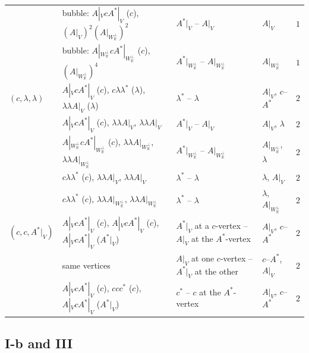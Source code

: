 \begin{tabular}{l|l|l|l|c}
 & bubble: $A|_VcA^*|_V$ ($c$), $(A|_V)^2(A|_{W_{\mathbb R}^\perp})^2$ & $A^*|_V$ -- $A|_V$ & $A|_V$ & $1$ \\
 & bubble: $A|_{W_{\mathbb R}^\perp}cA^*|_{W_{\mathbb R}^\perp}$ ($c$), $(A|_{W_{\mathbb R}^\perp})^4$ & $A^*|_{W_{\mathbb R}^\perp}$ -- $A|_{W_{\mathbb R}^\perp}$ & $A|_{W_{\mathbb R}^\perp}$ & $1$ \\
\hline
$(c,\lambda,\lambda)$ & $A|_VcA^*|_V$ ($c$), $c\lambda\lambda^*$ ($\lambda$), $\lambda\lambda A|_V$ ($\lambda$) & $\lambda^*$ -- $\lambda$ & $A|_V$, $c$--$A^*$ & $2$ \\
 & $A|_VcA^*|_V$ ($c$), $\lambda\lambda A|_V$, $\lambda\lambda A|_V$ & $A^*|_V$ -- $A|_V$ & $A|_V$, $\lambda$ & $2$ \\
 & $A|_{W_{\mathbb R}^\perp}cA^*|_{W_{\mathbb R}^\perp}$ ($c$), $\lambda\lambda A|_{W_{\mathbb R}^\perp}$, $\lambda\lambda A|_{W_{\mathbb R}^\perp}$ & $A^*|_{W_{\mathbb R}^\perp}$ -- $A|_{W_{\mathbb R}^\perp}$ & $A|_{W_{\mathbb R}^\perp}$, $\lambda$ & $2$ \\
 & $c\lambda\lambda^*$ ($c$), $\lambda\lambda A|_V$, $\lambda\lambda A|_V$ & $\lambda^*$ -- $\lambda$ & $\lambda$, $A|_V$ & $2$ \\
 & $c\lambda\lambda^*$ ($c$), $\lambda\lambda A|_{W_{\mathbb R}^\perp}$, $\lambda\lambda A|_{W_{\mathbb R}^\perp}$ & $\lambda^*$ -- $\lambda$ & $\lambda$, $A|_{W_{\mathbb R}^\perp}$ & $2$ \\
\hline
$(c,c,A^*|_V)$ & $A|_VcA^*|_V$ ($c$), $A|_VcA^*|_V$ ($c$), $A|_VcA^*|_V$ ($A^*|_V$) & $A^*|_V$ at a $c$-vertex -- $A|_V$ at the $A^*$-vertex & $A|_V$, $c$--$A^*$ & $2$ \\
 & same vertices & $A|_V$ at one $c$-vertex -- $A^*|_V$ at the other & $c$--$A^*$, $A|_V$ & $2$ \\
 & $A|_VcA^*|_V$ ($c$), $ccc^*$ ($c$), $A|_VcA^*|_V$ ($A^*|_V$) & $c^*$ -- $c$ at the $A^*$-vertex & $A|_V$, $c$--$A^*$ & $2$ \\
\end{tabular}

\subsection{I-b and III}

